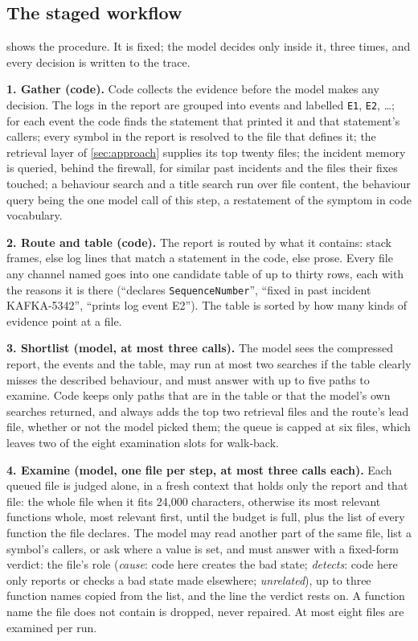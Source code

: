 \subsection{The staged workflow}
\label{sec:agent:stages}

 shows the procedure. It is fixed; the model decides
only inside it, three times, and every decision is written to the
trace.

\textbf{1. Gather (code).} Code collects the evidence before the model
makes any decision. The logs in the report are grouped into events and labelled
\texttt{E1}, \texttt{E2}, \ldots; for each event the code finds the
statement that printed it and that statement's callers; every symbol in
the report is resolved to the file that defines it; the retrieval layer
of \cref{sec:approach} supplies its top twenty files; the incident
memory is queried, behind the firewall, for similar past incidents and
the files their fixes touched; a behaviour search and a title search run
over file content, the behaviour query being the one model call of this
step, a restatement of the symptom in code vocabulary.

\textbf{2. Route and table (code).} The report is routed by what it
contains: stack frames, else log lines that match a statement in the
code, else prose. Every file any channel named goes into one candidate
table of up to thirty rows, each with the reasons it is there
(``declares \texttt{SequenceNumber}'', ``fixed in past incident
KAFKA-5342'', ``prints log event E2''). The table is sorted by how many
kinds of evidence point at a file.

\textbf{3. Shortlist (model, at most three calls).} The model sees the
compressed report, the events and the table, may run at most two
searches if the table clearly misses the described behaviour, and must
answer with up to five paths to examine. Code keeps only paths that are
in the table or that the model's own searches returned, and always adds
the top two retrieval files and the route's lead file, whether or not
the model picked them; the queue is capped at six files, which leaves
two of the eight examination slots for walk-back.

\textbf{4. Examine (model, one file per step, at most three calls
each).} Each queued file is judged alone, in a fresh context that holds
only the report and that file: the whole file when it fits 24{,}000
characters, otherwise its most relevant functions whole, most relevant
first, until the budget is full, plus the list of every function the
file declares. The model may read another part of the same file, list a
symbol's callers, or ask where a value is set, and must answer with a
fixed-form verdict: the file's role (\emph{cause}: code here creates
the bad state; \emph{detects}: code here only reports or checks a bad
state made elsewhere; \emph{unrelated}), up to three function names
copied from the list, and the line the verdict rests on. A function name
the file does not contain is dropped, never repaired. At most eight
files are examined per run.

